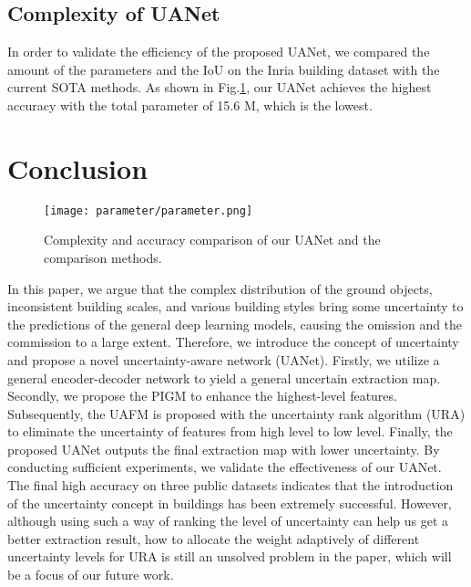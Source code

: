 \documentclass[lettersize,journal]{IEEEtran}
\begin{document}
\subsection{Complexity of UANet}

In order to validate the efficiency of the proposed UANet, we compared the amount of the parameters and the IoU on the Inria building dataset with the current SOTA methods. As shown in Fig.\ref{fig_parameter}, our UANet achieves the highest accuracy with the total parameter of 15.6 M, which is the lowest.

\section{Conclusion}

\begin{figure}
\centering
\texttt{[image: parameter/parameter.png]}\caption{Complexity and accuracy comparison of our UANet and the comparison methods.}
\label{fig_parameter}
\vspace{-1.0em}
\end{figure}
In this paper, we argue that the complex distribution of the ground objects, inconsistent building scales, and various building styles bring some uncertainty to the predictions of the general deep learning models, causing the omission and the commission to a large extent. Therefore, we introduce the concept of uncertainty and propose a novel uncertainty-aware network (UANet). Firstly, we utilize a general encoder-decoder network to yield a general uncertain extraction map. Secondly, we propose the PIGM to enhance the highest-level features. Subsequently, the UAFM is proposed with the uncertainty rank algorithm (URA) to eliminate the uncertainty of features from high level to low level. Finally, the proposed UANet outputs the final extraction map with lower uncertainty. By conducting sufficient experiments, we validate the effectiveness of our UANet. The final high accuracy on three public datasets indicates that the introduction of the uncertainty concept in buildings has been extremely successful. However, although using such a way of ranking the level of uncertainty can help us get a better extraction result, how to allocate the weight adaptively of different uncertainty levels for URA is still an unsolved problem in the paper, which will be a focus of our future work.
\end{document}
